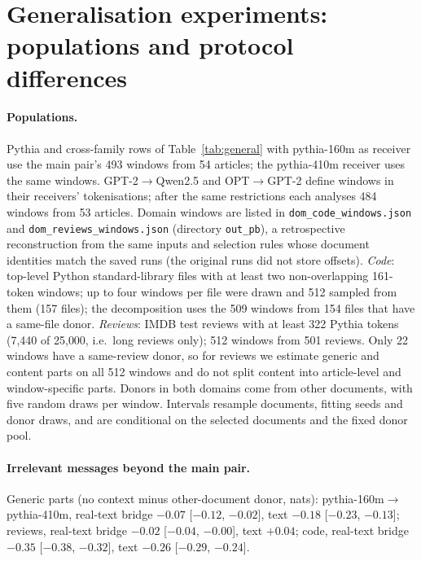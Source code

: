 \section{Generalisation experiments: populations and protocol differences}
\label{app:general}

\paragraph{Populations.} Pythia and cross-family rows of Table~\ref{tab:general} with pythia-160m as receiver use the main pair's 493 windows from 54 articles; the pythia-410m receiver uses the same windows. GPT-2$\to$Qwen2.5 and OPT$\to$GPT-2 define windows in their receivers' tokenisations; after the same restrictions each analyses 484 windows from 53 articles. Domain windows are listed in \texttt{dom\_code\_windows.json} and \texttt{dom\_reviews\_windows.json} (directory \texttt{out\_pb}), a retrospective reconstruction from the same inputs and selection rules whose document identities match the saved runs (the original runs did not store offsets). \emph{Code}: top-level Python standard-library files with at least two non-overlapping 161-token windows; up to four windows per file were drawn and 512 sampled from them (157 files); the decomposition uses the 509 windows from 154 files that have a same-file donor. \emph{Reviews}: IMDB test reviews with at least 322 Pythia tokens (7{,}440 of 25{,}000, i.e.\ long reviews only); 512 windows from 501 reviews. Only 22 windows have a same-review donor, so for reviews we estimate generic and content parts on all 512 windows and do not split content into article-level and window-specific parts. Donors in both domains come from other documents, with five random draws per window. Intervals resample documents, fitting seeds and donor draws, and are conditional on the selected documents and the fixed donor pool.

\paragraph{Irrelevant messages beyond the main pair.} Generic parts (no context minus other-document donor, nats): pythia-160m$\to$pythia-410m, real-text bridge $-0.07$ [$-0.12$, $-0.02$], text $-0.18$ [$-0.23$, $-0.13$]; reviews, real-text bridge $-0.02$ [$-0.04$, $-0.00$], text $+0.04$; code, real-text bridge $-0.35$ [$-0.38$, $-0.32$], text $-0.26$ [$-0.29$, $-0.24$].

